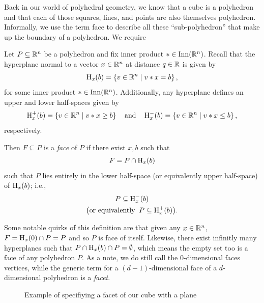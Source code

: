 \documentclass[12pt,oneside]{../../sfsuthesis}
\begin{document}
Back in our world of polyhedral geometry, we know that a cube is a polyhedron and that each of those squares, lines, and points are also themselves polyhedron.
Informally, we use the term face to describe all these ``sub-polyhedron'' that make up the boundary of a polyhedron.
We require
\begin{definition}[Face]\th\label{def:face}
    Let \( P \subseteq \mathbb{R}^n \) be a polyhedron and fix inner product \( \ast \in \operatorname{Inn}(\mathbb{R}^n) \).
    Recall that the hyperplane normal to a vector \( x \in \mathbb{R}^n \) at distance \( q \in \mathbb{R} \)  is given by
    \[
        \operatorname{H}_x(b) = \left\{ v \in \mathbb{R}^n \; \middle| \; v \ast x = b \right\},
    \]
    for some inner product \(\ast \in \operatorname{Inn}(\mathbb{R}^n) \).
    Additionally, any hyperplane defines an upper and lower half-spaces given by
    \[
        \operatorname{H}^{+}_x(b) = \left\{ v \in \mathbb{R}^n \; \middle| \; v \ast x \geq b \right\} \quad \text{and} \quad \operatorname{H}^{-}_x(b) = \left\{ v \in \mathbb{R}^n \; \middle| \; v \ast x \leq b \right\},
    \]
    respectively.

    Then \( F \subseteq P \) is a \emph{face} of \( P \) if there exist \( x, b \) such that
    \[
        F = P \cap \operatorname{H}_x(b)
    \]
    such that \( P \) lies entirely in the lower half-space (or equivalently upper half-space) of \( \operatorname{H}_x(b) \); i.e.,
    \begin{gather*}
        P \subseteq \operatorname{H}^{-}_x(b) \\
        \big( \text{or equivalently} \;\; P \subseteq \operatorname{H}^{+}_x(b) \big).
    \end{gather*}

\end{definition}
Some notable quirks of this definition are that given any \( x \in \mathbb{R}^n \), \( F = \operatorname{H}_x(0) \cap P = P \) and so \( P \) is face of itself.
Likewise, there exist infinitly many hyperplanes such that \( P \cap \operatorname{H}_x(b) \cap P = \emptyset \), which means the empty set too is a face of any polyhedron \( P \).
As a note, we do still call the \( 0 \)-dimensional faces vertices, while the generic term for a \( (d - 1) \)-dimensional face of a \( d \)-dimensional polyhedron is a \textit{facet}.
\begin{figure}[H]
    \centering
    \caption{Example of specifiying a facet of our cube with a plane}
\end{figure}
\end{document}
